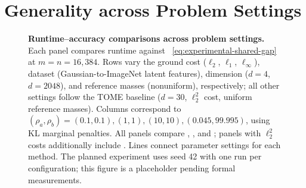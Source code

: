\section{Generality across Problem Settings}
\label{app:uot-generality}

\begin{figure}[htbp]
\centering
\caption{\textbf{Runtime--accuracy comparisons across problem settings.}
Each panel compares runtime against \sharedgap~\eqref{eq:experimental-shared-gap} at $m=n=16{,}384$.
Rows vary the ground cost ($\ell_2$, $\ell_1$, $\ell_\infty$), dataset (Gaussian-to-ImageNet latent features), dimension ($d=4$, $d=2048$), and reference masses (nonuniform), respectively; all other settings follow the TOME baseline ($d=30$, $\ell_2^2$ cost, uniform reference masses).
Columns correspond to $(\rho_a,\rho_b)=(0.1,0.1),(1,1),(10,10),(0.045,99.995)$, using KL marginal penalties.
All panels compare \ours, \mm, and \sinkhorn; panels with $\ell_2^2$ costs additionally include \hellouot.
Lines connect parameter settings for each method.
The planned experiment uses seed 42 with one run per configuration; this figure is a placeholder pending formal measurements.}
\label{fig:uot-generality}
\end{figure}

